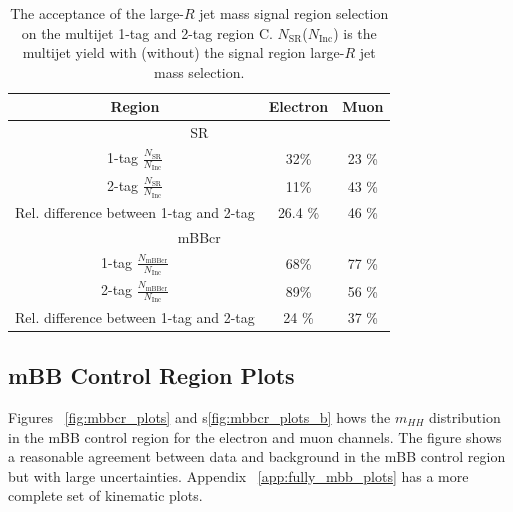 \begin{table}[!htbp]
\begin{center}
\begin{tabular}{c|c|c}
\hline
Region    & Electron          & Muon      \\
\hline
\multicolumn{3}{c}{SR} \\
\hline
1-tag $\frac{N_\text{SR}}{N_\text{Inc}}$ &  32\% & 23 \% \\
2-tag $\frac{N_\text{SR}}{N_\text{Inc}}$ &  11\% & 43 \% \\
\hline \hline
Rel. difference between 1-tag and 2-tag & 26.4 \% & 46 \% \\
\hline
\multicolumn{3}{c}{mBBcr} \\
\hline
1-tag $\frac{N_\text{mBBcr}}{N_\text{Inc}}$ &  68\% & 77 \% \\
2-tag $\frac{N_\text{mBBcr}}{N_\text{Inc}}$ &  89\% & 56 \% \\
\hline \hline
Rel. difference between 1-tag and 2-tag &  24 \% &   37 \% \\
\end{tabular}
\end{center}
\caption[The acceptance of the large-$R$ jet mass signal region selection on the multijet
1-tag and 2-tag region C]{The acceptance of the large-$R$ jet mass signal region selection on the multijet
1-tag and 2-tag region C. $N_\text{SR}$($N_\text{Inc}$) is the multijet yield
with (without) the signal region large-$R$ jet mass selection.}
\label{tab:boosted_syst_qcd_norm_mBBAcc}
\end{table}
 
\subsection{mBB Control Region Plots}
\label{ssec:mbbcr_plots_whad}
Figures ~\ref{fig:mbbcr_plots} and s\ref{fig:mbbcr_plots_b} hows the $m_{HH}$ distribution in the mBB control region for the electron and muon channels. The figure shows a reasonable agreement between data and background in the mBB control region but with large uncertainties. Appendix ~\ref{app:fully_mbb_plots} has a more complete set of kinematic plots. 

